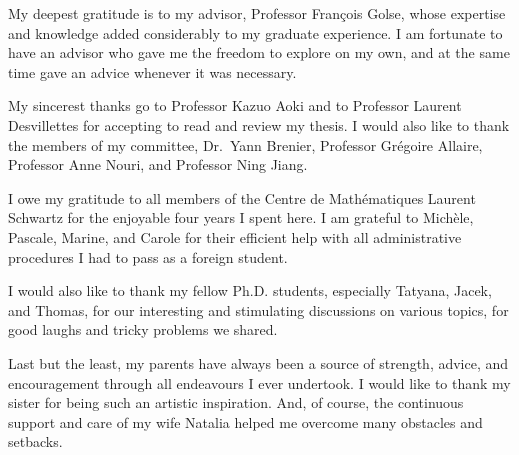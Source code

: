 My deepest gratitude is to my advisor, Professor François Golse, whose expertise and knowledge added considerably to my graduate experience. I am fortunate to have an advisor who gave me the freedom to explore on my own, and at the same time gave an advice whenever it was necessary.

My sincerest thanks go to Professor Kazuo Aoki and to Professor Laurent Desvillettes for accepting to read and review my thesis. I would also like to thank the members of my committee, Dr.\ Yann Brenier, Professor Grégoire Allaire, Professor Anne Nouri, and Professor Ning Jiang.

I owe my gratitude to all members of the Centre de Mathématiques Laurent Schwartz for the enjoyable four years I spent here. I am grateful to Michèle, Pascale, Marine, and Carole for their efficient help with all administrative procedures I had to pass as a foreign student.

I would also like to thank my fellow Ph.D. students, especially Tatyana, Jacek, and Thomas, for our interesting and stimulating discussions on various topics, for good laughs and tricky problems we shared.

Last but the least, my parents have always been a source of strength, advice, and encouragement through all endeavours I ever undertook. I would like to thank my sister for being such an artistic inspiration. And, of course, the continuous support and care of my wife Natalia helped me overcome many obstacles and setbacks.
